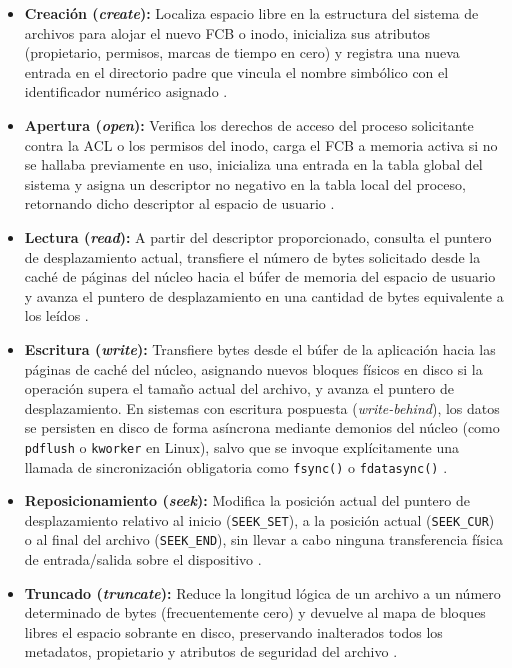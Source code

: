 \documentclass[12pt]{article}
\begin{document}
\begin{itemize}[noitemsep, topsep=2pt]
    \item \textbf{Creación (\textit{create}):} Localiza espacio libre en la estructura del sistema de archivos para alojar el nuevo FCB o inodo, inicializa sus atributos (propietario, permisos, marcas de tiempo en cero) y registra una nueva entrada en el directorio padre que vincula el nombre simbólico con el identificador numérico asignado \parencite[\S 10.1.2, p.\ 335]{silberschatz2006fundamentos}.
    \item \textbf{Apertura (\textit{open}):} Verifica los derechos de acceso del proceso solicitante contra la ACL o los permisos del inodo, carga el FCB a memoria activa si no se hallaba previamente en uso, inicializa una entrada en la tabla global del sistema y asigna un descriptor no negativo en la tabla local del proceso, retornando dicho descriptor al espacio de usuario \parencite[\S 11.2, p.\ 373]{silberschatz2006fundamentos}.
    \item \textbf{Lectura (\textit{read}):} A partir del descriptor proporcionado, consulta el puntero de desplazamiento actual, transfiere el número de bytes solicitado desde la caché de páginas del núcleo hacia el búfer de memoria del espacio de usuario y avanza el puntero de desplazamiento en una cantidad de bytes equivalente a los leídos \parencite[\S 10.1.2, p.\ 335]{silberschatz2006fundamentos}.
    \item \textbf{Escritura (\textit{write}):} Transfiere bytes desde el búfer de la aplicación hacia las páginas de caché del núcleo, asignando nuevos bloques físicos en disco si la operación supera el tamaño actual del archivo, y avanza el puntero de desplazamiento. En sistemas con escritura pospuesta (\textit{write-behind}), los datos se persisten en disco de forma asíncrona mediante demonios del núcleo (como \texttt{pdflush} o \texttt{kworker} en Linux), salvo que se invoque explícitamente una llamada de sincronización obligatoria como \texttt{fsync()} o \texttt{fdatasync()} \parencite[\S 8.4.2, p.\ 441]{carretero2001sistemas}.
    \item \textbf{Reposicionamiento (\textit{seek}):} Modifica la posición actual del puntero de desplazamiento relativo al inicio (\texttt{SEEK\_SET}), a la posición actual (\texttt{SEEK\_CUR}) o al final del archivo (\texttt{SEEK\_END}), sin llevar a cabo ninguna transferencia física de entrada/salida sobre el dispositivo \parencite[\S 10.1.2, pp.\ 335--336]{silberschatz2006fundamentos}.
    \item \textbf{Truncado (\textit{truncate}):} Reduce la longitud lógica de un archivo a un número determinado de bytes (frecuentemente cero) y devuelve al mapa de bloques libres el espacio sobrante en disco, preservando inalterados todos los metadatos, propietario y atributos de seguridad del archivo \parencite[\S 10.1.2, p.\ 335]{silberschatz2006fundamentos}.

\end{itemize}
\end{document}
